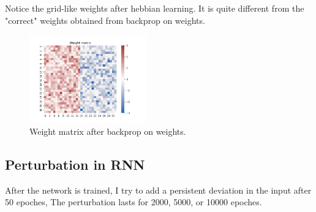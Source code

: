 \documentclass[12pt, a4paper]{article}
\begin{document}
Notice the grid-like weights after hebbian learning. It is quite different from the "correct" weights obtained from backprop on weights.

\begin{figure}[H]
    \centering
    \includegraphics[width=0.45\textwidth]{RNN/ourRNN/analysis/fig/0122_SIN2_wt_weight_matrix.png}
    \caption{Weight matrix after backprop on weights.}
\end{figure}

\subsection*{Perturbation in RNN}

After the network is trained, I try to add a persistent deviation in the input after 50 epoches, The perturbation lasts for 2000, 5000, or 10000 epoches.
\end{document}
